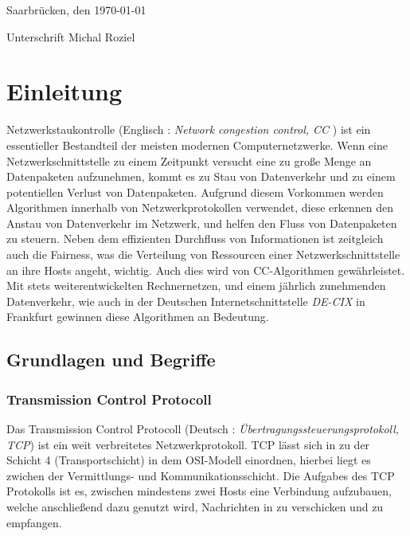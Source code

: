 \documentclass[paper=a4,fontsize=12pt,ngerman]{scrartcl}
\begin{document}
Saarbrücken, den \today

\smallskip
Unterschrift  Michal Roziel




\clearpage
\tableofcontents 

\clearpage
{}



\section{Einleitung}

Netzwerkstaukontrolle (Englisch : \textit{ Network congestion control, CC }) ist ein essentieller Bestandteil der 
meisten modernen Computernetzwerke. 
Wenn eine Netzwerkschnittstelle zu einem Zeitpunkt versucht eine zu große Menge an Datenpaketen aufzunehmen,
kommt es zu Stau von Datenverkehr und zu einem potentiellen Verlust von Datenpaketen.
Aufgrund diesem Vorkommen werden Algorithmen innerhalb von Netzwerkprotokollen verwendet, diese erkennen den Anstau von Datenverkehr im Netzwerk,
und helfen den Fluss von Datenpaketen zu steuern. Neben dem effizienten Durchfluss von Informationen ist zeitgleich auch die Fairness, 
was die Verteilung von Ressourcen einer Netzwerkschnittstelle an ihre Hosts angeht, wichtig. Auch dies wird von CC-Algorithmen gewährleistet.
\newline
Mit stets weiterentwickelten Rechnernetzen, und einem jährlich zunehmenden Datenverkehr, wie auch in der Deutschen Internetschnittstelle
\textit{DE-CIX}\cite{DE-CIX2025} in Frankfurt gewinnen diese Algorithmen an Bedeutung. 





\subsection{Grundlagen und Begriffe}

\subsubsection{Transmission Control Protocoll}

Das Transmission Control Protocoll (Deutsch : \textit{Übertragungssteuerungsprotokoll, TCP}) ist ein weit verbreitetes Netzwerkprotokoll. 
TCP lässt sich in zu der Schicht 4 (Transportschicht) in dem OSI-Modell einordnen, hierbei liegt es zwichen der Vermittlungs- und Kommunikationsschicht.
\newline
Die Aufgabes des TCP Protokolls ist es, zwischen mindestens zwei Hosts eine Verbindung aufzubauen, welche anschließend dazu genutzt wird,  
Nachrichten in zu verschicken und zu empfangen.
\end{document}
